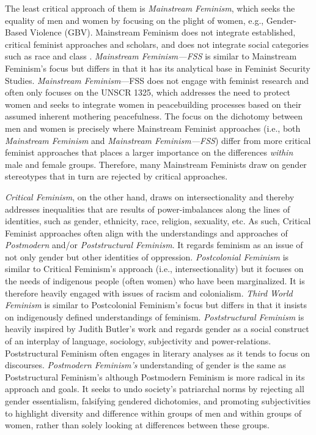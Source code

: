 \documentclass[10pt,a4paper]{article}
\begin{document}
\begin{multicols}{2}
The least critical approach of them is \textit{Mainstream Feminism}, which seeks the equality of men and women by focusing on the plight of women, e.g., Gender-Based Violence (GBV). Mainstream Feminism does not integrate established, critical feminist approaches and scholars, and does not integrate social categories such as race and class \citep{R32}. \textit{Mainstream Feminism---FSS} is similar to Mainstream Feminism's focus but differs in that it has its analytical base in Feminist Security Studies. \textit{Mainstream Feminism}---FSS does not engage with feminist research and often only focuses on the UNSCR 1325, which addresses the need to protect women and seeks to integrate women in peacebuilding processes based on their assumed inherent mothering peacefulness. The focus on the dichotomy between men and women is precisely where Mainstream Feminist approaches (i.e., both \textit{Mainstream Feminism} and \textit{Mainstream Feminism---FSS}) differ from more critical feminist approaches that places a larger importance on the differences \textit{within} male and female groups. Therefore, many Mainstream Feminists draw on gender stereotypes that in turn are rejected by critical approaches. 

\textit{Critical Feminism}, on the other hand, draws on intersectionality and thereby addresses inequalities that are results of power-imbalances along the lines of identities, such as gender, ethnicity, race, religion, sexuality, etc. As such, Critical Feminist approaches often align with the understandings and approaches of \textit{Postmodern} and/or \textit{Poststructural Feminism}. It regards feminism as an issue of not only gender but other identities of oppression. \textit{Postcolonial Feminism} is similar to Critical Feminism's approach (i.e., intersectionality) but it focuses on the needs of indigenous people (often women) who have been marginalized. It is therefore heavily engaged with issues of racism and colonialism. \textit{Third World Feminism} is similar to Postcolonial Feminism's focus but differs in that it insists on indigenously defined understandings of feminism. \textit{Poststructural Feminism} is heavily inspired by Judith Butler's work and regards gender as a social construct of an interplay of language, sociology, subjectivity and power-relations. Poststructural Feminism often engages in literary analyses as it tends to focus on discourses. \textit{Postmodern Feminism's} understanding of gender is the same as Poststructural Feminism's although Postmodern Feminism is more radical in its approach and goals. It seeks to undo society's patriarchal norms by rejecting all gender essentialism, falsifying gendered dichotomies, and promoting subjectivities to highlight diversity and difference within groups of men and within groups of women, rather than solely looking at differences between these groups.


\end{multicols}
\end{document}
